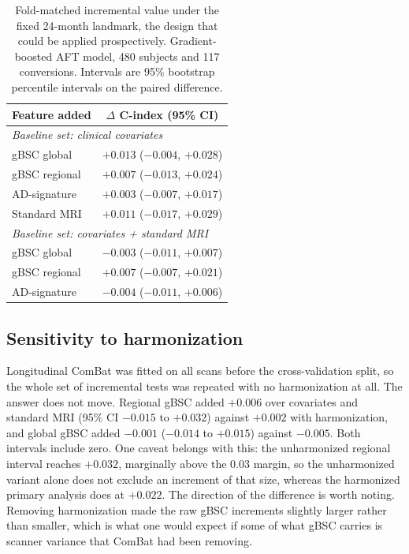 \documentclass[blue]{ludusofficial}  %
\begin{document}
\begin{table}[htbp]
\centering
\footnotesize
\setlength{\tabcolsep}{4pt}
\caption{Fold-matched incremental value under the fixed 24-month landmark, the design that could be applied prospectively. Gradient-boosted AFT model, 480 subjects and 117 conversions. Intervals are 95\% bootstrap percentile intervals on the paired difference.}
\label{tab:landmark}
\begin{tabular}{lc}
\hline
\textbf{Feature added} & \textbf{$\Delta$ C-index (95\% CI)} \\
\hline
\multicolumn{2}{l}{\textit{Baseline set: clinical covariates}} \\
\quad gBSC global & $+0.013$ ($-0.004$, $+0.028$) \\
\quad gBSC regional & $+0.007$ ($-0.013$, $+0.024$) \\
\quad AD-signature & $+0.003$ ($-0.007$, $+0.017$) \\
\quad Standard MRI & $+0.011$ ($-0.017$, $+0.029$) \\
\multicolumn{2}{l}{\textit{Baseline set: covariates + standard MRI}} \\
\quad gBSC global & $-0.003$ ($-0.011$, $+0.007$) \\
\quad gBSC regional & $+0.007$ ($-0.007$, $+0.021$) \\
\quad AD-signature & $-0.004$ ($-0.011$, $+0.006$) \\
\hline
\end{tabular}
\end{table}

\subsection{Sensitivity to harmonization}

Longitudinal ComBat was fitted on all scans before the cross-validation split, so the whole set of incremental tests was repeated with no harmonization at all. The answer does not move. Regional gBSC added $+0.006$ over covariates and standard MRI (95\% CI $-0.015$ to $+0.032$) against $+0.002$ with harmonization, and global gBSC added $-0.001$ ($-0.014$ to $+0.015$) against $-0.005$. Both intervals include zero. One caveat belongs with this: the unharmonized regional interval reaches $+0.032$, marginally above the 0.03 margin, so the unharmonized variant alone does not exclude an increment of that size, whereas the harmonized primary analysis does at $+0.022$. The direction of the difference is worth noting. Removing harmonization made the raw gBSC increments slightly larger rather than smaller, which is what one would expect if some of what gBSC carries is scanner variance that ComBat had been removing.
\end{document}
